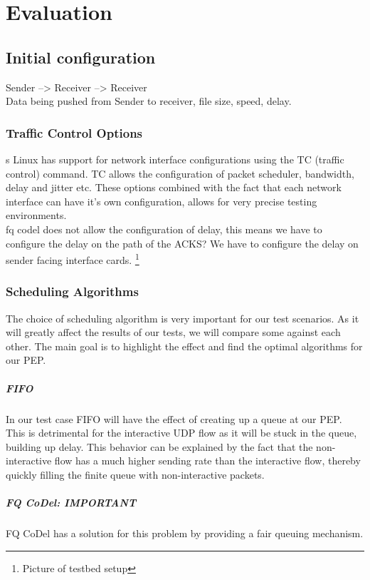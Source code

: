 \documentclass[a4paper,english, 11pt]{report}
\begin{document}
\chapter{Evaluation}

\section{Initial configuration}

Sender --> Receiver --> Receiver
\\
Data being pushed from Sender to receiver, file size, speed, delay.
\subsection{Traffic Control Options}s
Linux has support for network interface configurations using the TC (traffic control) command. TC allows the configuration of packet scheduler, bandwidth, delay and jitter etc. These options combined with the fact that each network interface can have it's own configuration, allows for very precise testing environments. 
\\
fq codel does not allow the configuration of delay, this means we have to configure the delay on the path of the ACKS?
We have to configure the delay on sender facing interface cards. 
\footnote{Picture of testbed setup} 

\subsection{Scheduling Algorithms}
The choice of scheduling algorithm is very important for our test scenarios. As it will greatly affect the results of our tests, we will compare some against each other. The main goal is to highlight the effect and find the optimal algorithms for our PEP.

\paragraph{FIFO}
In our test case FIFO will have the effect of creating up a queue at our PEP. This is detrimental for the interactive UDP flow as it will be stuck in the queue, building up delay. This behavior can be explained by the fact that the non-interactive flow has a much higher sending rate than the interactive flow, thereby quickly filling the finite queue with non-interactive packets.

\paragraph{FQ CoDel: IMPORTANT}
FQ CoDel has a solution for this problem by providing a fair queuing mechanism. 
\end{document}
